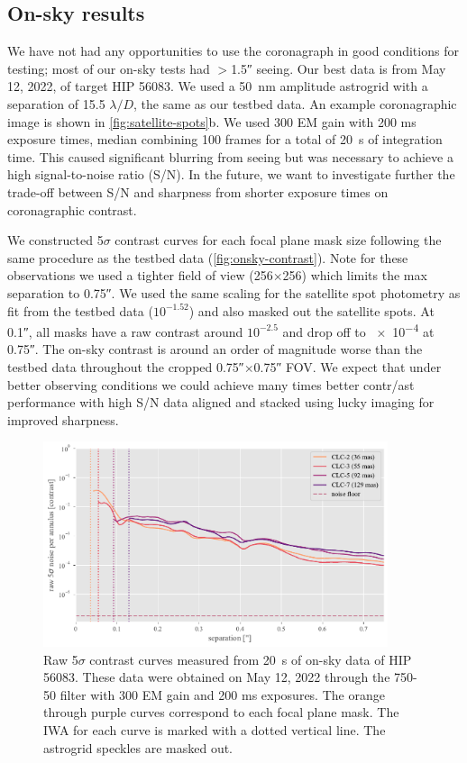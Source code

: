 \documentclass[]{spie}  %
\begin{document}
\subsection{On-sky results}\label{sec:onsky}

We have not had any opportunities to use the coronagraph in good conditions for testing; most of our on-sky tests had $>$\ang{;;1.5} seeing. Our best data is from May 12, 2022, of target HIP 56083. We used a \qty{50}{\nano\meter} amplitude astrogrid with a separation of 15.5 $\lambda/D$, the same as our testbed data. An example coronagraphic image is shown in \autoref{fig:satellite-spots}b. We used 300 EM gain with 200 ms exposure times, median combining 100 frames for a total of \qty{20}{\second} of integration time. This caused significant blurring from seeing but was necessary to achieve a high signal-to-noise ratio (S/N). In the future, we want to investigate further the trade-off between S/N and sharpness from shorter exposure times on coronagraphic contrast.

We constructed 5$\sigma$ contrast curves for each focal plane mask size following the same procedure as the testbed data (\autoref{fig:onsky-contrast}). Note for these observations we used a tighter field of view (256$\times$256) which limits the max separation to \ang{;;0.75}. We used the same scaling for the satellite spot photometry as fit from the testbed data ($10^{-1.52}$) and also masked out the satellite spots. At \ang{;;0.1}, all masks have a raw contrast around $10^{-2.5}$ and drop off to \num{e-4} at \ang{;;0.75}. The on-sky contrast is around an order of magnitude worse than the testbed data throughout the cropped \ang{;;0.75}$\times$\ang{;;0.75} FOV. We expect that under better observing conditions we could achieve many times better contr/ast performance with high S/N data aligned and stacked using lucky imaging for improved sharpness.

\begin{figure}
   \centering
   \includegraphics[width=0.9\textwidth]{figures/HIP56083_20220512_curves}
   \caption{Raw 5$\sigma$ contrast curves measured from \qty{20}{\second} of on-sky data of HIP 56083. These data were obtained on May 12, 2022 through the 750-50 filter with 300 EM gain and 200 ms exposures. The orange through purple curves correspond to each focal plane mask. The IWA for each curve is marked with a dotted vertical line. The astrogrid speckles are masked out.}\label{fig:onsky-contrast}
\end{figure}
\end{document}
